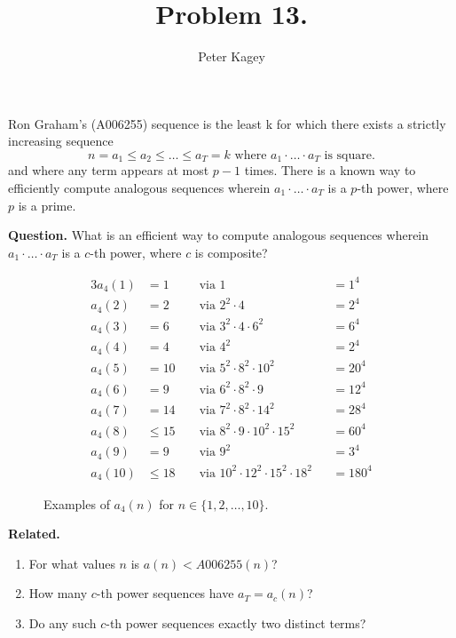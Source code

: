 \documentclass{article}
\newenvironment{question}{\begin{trivlist}\item[\textbf{Question.}]}{\end{trivlist}}
\newenvironment{related}{\begin{trivlist}\item[\textbf{Related.}]\end{trivlist}\begin{enumerate}}{\end{enumerate}}
\begin{document}
\title{Problem 13.}
\date{}
\author{Peter Kagey}
\maketitle
  Ron Graham's (A006255) sequence is the least k for which there exists a
  strictly increasing sequence \[
    n = a_1 \leq a_2 \leq \hdots \leq a_T = k \text{ where }
    a_1 \cdot\hdots\cdot a_T \text{ is square.}
  \] and where any term appears at most $p - 1$ times.
  There is a known way to efficiently compute analogous sequences wherein
  $a_1 \cdot\hdots\cdot a_T$ is a $p$-th power, where $p$ is a prime.
\begin{question}
  What is an efficient way to compute analogous sequences wherein
  $a_1 \cdot\hdots\cdot a_T$ is a $c$-th power, where $c$ is composite?
\end{question}
\begin{figure}[!h]
  \centering
  \begin{alignat*}{3}
  a_4(1) &= 1      &&\text{ via } 1                                     &&= 1^4\\
  a_4(2) &= 2      &&\text{ via } 2^2 \cdot 4                           &&= 2^4\\
  a_4(3) &= 6      &&\text{ via } 3^2 \cdot 4 \cdot 6^2                 &&= 6^4\\
  a_4(4) &= 4      &&\text{ via } 4^2                                   &&= 2^4\\
  a_4(5) &= 10     &&\text{ via } 5^2 \cdot 8^2 \cdot 10^2              &&= 20^4\\
  a_4(6) &= 9      &&\text{ via } 6^2 \cdot 8^2 \cdot 9                 &&= 12^4\\
  a_4(7) &= 14     &&\text{ via } 7^2 \cdot 8^2 \cdot 14^2              &&= 28^4\\
  a_4(8) &\leq 15  &&\text{ via } 8^2 \cdot 9 \cdot 10^2 \cdot 15^2     &&= 60^4\\
  a_4(9) &= 9      &&\text{ via } 9^2                                   &&= 3^4\\
  a_4(10) &\leq 18 &&\text{ via } 10^2 \cdot 12^2 \cdot 15^2 \cdot 18^2 &&= 180^4
  \end{alignat*}
  \caption{
    Examples of $a_4(n)$ for $n \in \{1, 2,\hdots,10\}$.
  }
\end{figure}

\begin{related}
  \item For what values $n$ is $a(n) < A006255(n)$?
  \item How many $c$-th power sequences have $a_T = a_c(n)$?
  \item Do any such $c$-th power sequences exactly two distinct terms?
\end{related}
\end{document}
